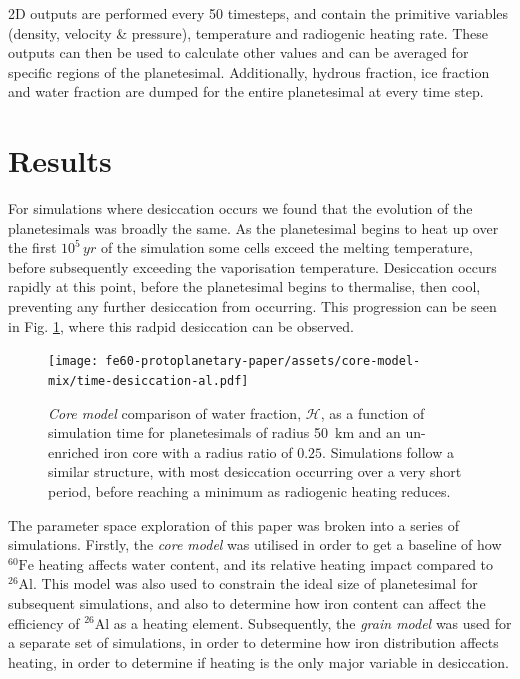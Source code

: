 \documentclass[fleqn,usenatbib]{mnras}
\newcommand{\atom}[2]{$^{#2}\text{#1}$}
\newcommand{\al}{\atom{Al}{26}}
\newcommand{\fe}{\atom{Fe}{60}}
\begin{document}
2D outputs are performed every 50 timesteps, and contain the primitive variables (density, velocity \& pressure), temperature and radiogenic heating rate.
These outputs can then be used to calculate other values and can be averaged for specific regions of the planetesimal.
Additionally, hydrous fraction, ice fraction and water fraction are dumped for the entire planetesimal at every time step.


\section{Results}
\label{sec:results}

For simulations where desiccation occurs we found that the evolution of the planetesimals was broadly the same.
As the planetesimal begins to heat up over the first $10^5\,\si{yr}$ of the simulation some cells exceed the melting temperature, before subsequently exceeding the vaporisation temperature.
Desiccation occurs rapidly at this point, before the planetesimal begins to thermalise, then cool, preventing any further desiccation from occurring.
This progression can be seen in Fig. \ref{fig:timecomparison}, where this radpid desiccation can be observed.


\begin{figure}
    \centering
    \texttt{[image: fe60-protoplanetary-paper/assets/core-model-mix/time-desiccation-al.pdf]}
    \caption{\emph{Core model} comparison of water fraction, $\mathcal{H}$, as a function of simulation time for planetesimals of radius \SI{50}{km} and an un-enriched iron core with a radius ratio of $0.25$. Simulations follow a similar structure, with most desiccation occurring over a very short period, before reaching a minimum as radiogenic heating reduces.}
    \label{fig:timecomparison}
\end{figure}



The parameter space exploration of this paper was broken into a series of simulations.
Firstly, the \emph{core model} was utilised in order to get a baseline of how \fe{} heating affects water content, and its relative heating impact compared to \al{}.
This model was also used to constrain the ideal size of planetesimal for subsequent simulations, and also to determine how iron content can affect the efficiency of \al{} as a heating element.
Subsequently, the \emph{grain model} was used for a separate set of simulations, in order to determine how iron distribution affects heating, in order to determine if heating is the only major variable in desiccation.
\end{document}
